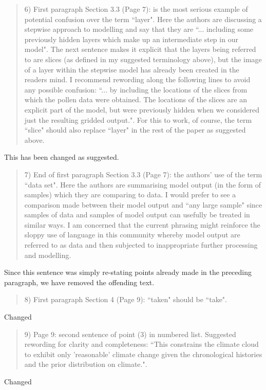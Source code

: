 \documentclass[a4paper,11pt]{article}
\begin{document}
\begin{framed} \begin{quote}
6) First paragraph Section 3.3 (Page 7): is the most serious example of potential confusion over the term ``layer".  Here the authors are discussing a stepwise approach to modelling and say that they are ``... including some previously hidden layers which make up an intermediate step in our model". The next sentence makes it explicit that the layers being referred to are slices (as defined in my suggested terminology above), but the image of a layer within the stepwise model has already been created in the readers mind.  I recommend rewording along the following lines to avoid any possible confusion: ``... by including the locations of the slices from which the pollen data were obtained. The locations of the slices are an explicit part of the model, but were previously hidden when we considered just the resulting gridded output.".  For this to work, of course, the term ``slice" should also replace ``layer" in the rest of the paper as suggested above.
\end{quote} \end{framed}
This has been changed as suggested.

\begin{framed} \begin{quote}
7) End of first paragraph Section 3.3 (Page 7): the authors' use of the term ``data set".  Here the authors are summarising model output (in the form of samples) which they are comparing to data.  I would prefer to see a comparison made between their model output and ``any large sample" since samples of data and samples of model output can usefully be treated in similar ways.  I am concerned that the current phrasing might reinforce the sloppy use of language in this community whereby model output are referred to as data and then subjected to inappropriate further processing and modelling.
\end{quote} \end{framed}
Since this sentence was simply re-stating points already made in the preceding paragraph, we have removed the offending text.

\begin{framed} \begin{quote}
8) First paragraph Section 4 (Page 9): ``taken" should be ``take".
\end{quote} \end{framed}
Changed

\begin{framed} \begin{quote}
9) Page 9: second sentence of point (3) in numbered list.  Suggested rewording for clarity and completeness: ``This constrains the climate cloud to exhibit only 'reasonable' climate change given the chronological histories and the prior distribution on climate.".
\end{quote} \end{framed}
Changed
\end{document}
